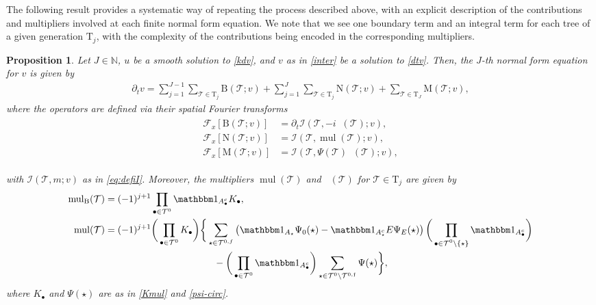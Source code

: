 \documentclass[a4paper,
11pt,  reqno]{amsart}
\newcommand{\5}{\textup{V}}
\newcommand{\noi}{\noindent}
\newcommand{\ind}{\mathbbm 1}
\newcommand{\dt}{\partial_t}
\newtheorem{proposition}[theorem]{Proposition}
\theoremstyle{remark}
\newcommand{\bul}{\bullet}
\newcommand{\TT}{\mathcal{T}}
\newcommand{\Tr}{\mathrm{T}}
\newcommand{\Ft}{{\mathcal{F}}}
\newcommand{\ff}{\mathfrak{f}}
\newcommand{\N}{\mathbb{N}}
\DeclareMathOperator{\mul}{mul}
\DeclareMathOperator{\mulB}{mul_{\BB}}
\newcommand{\Ical}{\mathcal{I}}
\numberwithin{equation}{section}
\numberwithin{theorem}{section}
\newcommand{\MM}{\mathrm{M}}
\newcommand{\NN}{\mathrm{N}}
\newcommand{\BB}{\mathrm{B}}
\begin{document}
The following result provides a systematic way of repeating the process described above, with an explicit description of the contributions and multipliers involved at each finite normal form equation. 
We note that we see one boundary term and an integral term for each tree of a given generation $\Tr_j$, with the complexity of the contributions being encoded in the corresponding multipliers.








\begin{proposition}
\label{PRO:NFE}
Let $J\in\N$, $u$ be a smooth solution to \eqref{kdv}, and $v$ as in \eqref{inter} be a solution to \eqref{dtv}.
Then, 
the $J$-th normal form equation for $v$ is given by
\begin{align}
\label{NFE1}
\dt v=
\sum_{j=1}^{J-1} \sum_{\TT\in \Tr_j} \BB(\TT; v) 
+ \sum_{j=1}^{J} \sum_{\TT\in \Tr_j} \NN(\TT; v) 
+ \sum_{\TT\in \Tr_{J}}
\MM(\TT; v),
\end{align}
where the operators are defined via their spatial Fourier transforms
\begin{align}
\label{NFE1a}
\begin{split}
\Ft_x [\BB(\TT;v)]  & = \dt\Ical(\TT, - i \mulB(\TT); v),\\
\Ft_x [\NN(\TT;v)]  & = \Ical(\TT, \mul(\TT) ; v  ), \\
\Ft_x [\MM(\TT;v)] & = \Ical(\TT, \Psi(\TT)\mulB(\TT); v),
\end{split}
\end{align}

\noi
with $\Ical(\TT, m; v)$ as in \eqref{eq:defiI}.
Moreover,
the multipliers $\mul(\TT)$ and $\mulB(\TT)$ for $\TT\in \Tr_j$ are given by
\begin{align}
\label{NFE0b}
\begin{split}
\mulB(\TT)
& =  (-1)^{j+1}  \prod_{\bul \in \TT^0}  \ind_{A^c_{\bul}} K_\bul
,
\\
\mul(\TT) & =  (-1)^{j+1} \bigg(\prod_{\bul \in \TT^0} K_\bul \bigg) \bigg\{  \sum_{\star \in \TT^{0,f}}
\left(\ind_{A_{\star}} \Psi_0(\star) - \ind_{A_{\star}^c} E\Psi_E(\star)\right)\bigg(\prod_{\substack{\bul \in \TT^0 \setminus\{\star\}
}} \ind_{A^c_{\bul}} \bigg)\\
&
\hspace{4cm}
-
\bigg( \prod_{\bul \in \TT^0} \ind_{A_\bul^c} \bigg)
\sum_{\star\in \TT^0 \setminus \TT^{0,\ff}} \Psi(\star)
 \bigg\},
\end{split}
\end{align}
where $K_\bul$ and $\Psi(\star)$ are as in \eqref{Kmul} and \eqref{psi-circ}. 

\end{proposition}
\end{document}
